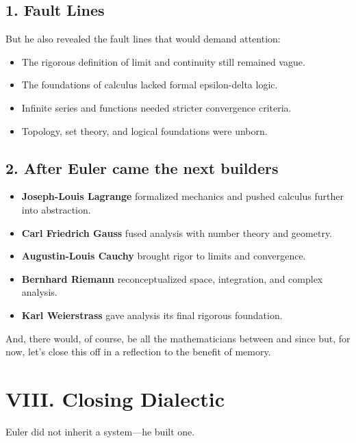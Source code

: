 \documentclass[9pt]{article}
\begin{document}
\vspace{1em}


\subsection*{1. Fault Lines}
But he also revealed the fault lines that would demand attention:
\begin{itemize}
  \item The rigorous definition of limit and continuity still remained vague.
  \item The foundations of calculus lacked formal epsilon-delta logic.
  \item Infinite series and functions needed stricter convergence criteria.
  \item Topology, set theory, and logical foundations were unborn.
\end{itemize}

\vspace{1em}

\subsection*{2. After Euler came the next builders}
\begin{itemize}
  \item \textbf{Joseph-Louis Lagrange} formalized mechanics and pushed calculus further into abstraction.
  \item \textbf{Carl Friedrich Gauss} fused analysis with number theory and geometry.
  \item \textbf{Augustin-Louis Cauchy} brought rigor to limits and convergence.
  \item \textbf{Bernhard Riemann} reconceptualized space, integration, and complex analysis.
  \item \textbf{Karl Weierstrass} gave analysis its final rigorous foundation.
\end{itemize}

\vspace{1em}

\noindent
And, there would, of course, be all the mathematicians between and since but, for now, let's close this off in a reflection to the benefit of memory.

\newpage

\section*{VIII. Closing Dialectic}
Euler did not inherit a system—he built one.
\end{document}
